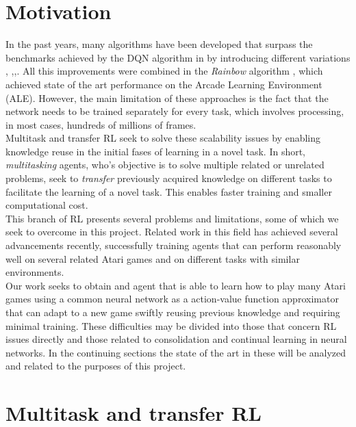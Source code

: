 \documentclass{article}
\begin{document}
\section{Motivation}
In the past years, many algorithms have been developed that surpass the benchmarks achieved by the DQN algorithm in \citep{MnihPlayingLearning} by introducing different variations \citep{Mnih2015Human-levelLearning}, \citep{vanHasselt2015DeepQ-learning},\citep{Wang2015DuelingLearning},\citep{Bellemare2017ALearning}. All this improvements were combined in the \textit{Rainbow} algorithm \citep{Hessel2017Rainbow:Learning}, which achieved state of the art performance on the Arcade Learning Environment (ALE)\citep{Bellemare2013TheAgents}. However, the main limitation of these approaches is the fact that the network needs to be trained separately for every task, which involves processing, in most cases, hundreds of millions of frames.\\
\newline 
Multitask and transfer RL seek to solve these scalability issues by enabling knowledge reuse in the initial fases of learning in a novel task. In short, \textit{multitasking} agents, who's objective is to solve multiple related or unrelated problems, seek to \textit{transfer} previously acquired knowledge on different tasks to facilitate the learning of a novel task. This enables faster training and smaller computational cost.\\
This branch of RL presents several problems and limitations, some of which we seek to overcome in this project. Related work in this field has achieved several advancements recently, successfully training agents that can perform reasonably well on several related Atari games and on different tasks with similar environments.\\
Our work seeks to obtain and agent that is able to learn how to play many Atari games using a common neural network as a action-value function approximator that can adapt to a new game swiftly reusing previous knowledge and requiring minimal training.
These difficulties may be divided into those that concern RL issues directly and those related to consolidation and continual learning in neural networks. In the continuing sections the state of the art in these will be analyzed and related to the purposes of this project.
\section{Multitask and transfer RL}
\end{document}

